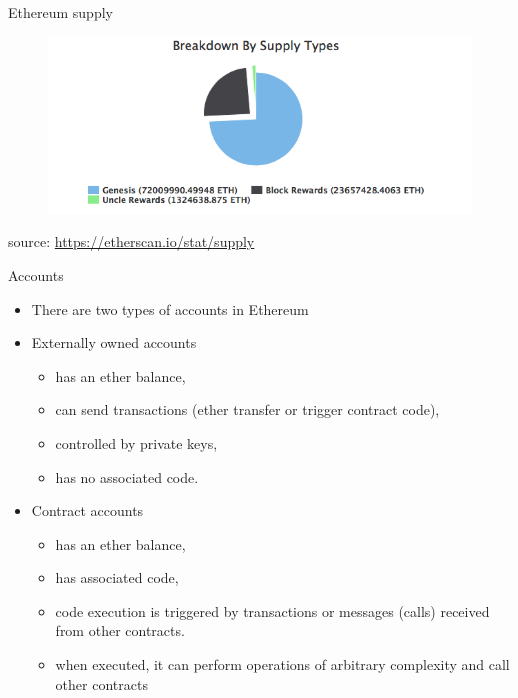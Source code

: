 \documentclass[9pt]{beamer}
\begin{document}

\begin{frame}{Ethereum supply}
	\begin{figure}[]
		\centering
		\includegraphics  [scale=0.5]{Images/eth-breakdown}
	\end{figure}
	\begin{scriptsize}
		source: \href{https://etherscan.io/stat/supply}{https://etherscan.io/stat/supply}
	\end{scriptsize}
\end{frame}


\begin{frame}{Accounts}
	\begin{itemize}
		\item There are two types of accounts in Ethereum
		\item Externally owned accounts
		\begin{small}
			\begin{itemize}
				\item has an ether balance,
				\item can send transactions (ether transfer or trigger contract code),
				\item controlled by private keys,
				\item has no associated code.
			\end{itemize}
		\end{small}
		\item Contract accounts
		\begin{small}
			\begin{itemize}
				\item has an ether balance,
				\item has associated code,
				\item code execution is triggered by transactions or messages (calls) received from other contracts.
				\item when executed, it can perform operations of arbitrary complexity and call other contracts
			\end{itemize}
		\end{small}
	\end{itemize}
\end{frame}
\end{document}
